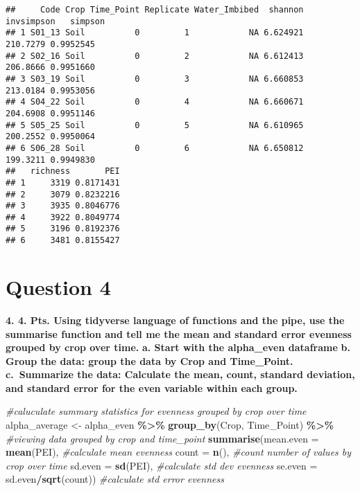 \documentclass[
]{article}
\newenvironment{Shaded}{\begin{snugshade}}{\end{snugshade}}
\newcommand{\AttributeTok}[1]{\textcolor[rgb]{0.13,0.29,0.53}{#1}}
\newcommand{\CommentTok}[1]{\textcolor[rgb]{0.56,0.35,0.01}{\textit{#1}}}
\newcommand{\FunctionTok}[1]{\textcolor[rgb]{0.13,0.29,0.53}{\textbf{#1}}}
\newcommand{\NormalTok}[1]{#1}
\newcommand{\OtherTok}[1]{\textcolor[rgb]{0.56,0.35,0.01}{#1}}
\newcommand{\SpecialCharTok}[1]{\textcolor[rgb]{0.81,0.36,0.00}{\textbf{#1}}}
\begin{document}
\begin{verbatim}
##     Code Crop Time_Point Replicate Water_Imbibed  shannon invsimpson   simpson
## 1 S01_13 Soil          0         1            NA 6.624921   210.7279 0.9952545
## 2 S02_16 Soil          0         2            NA 6.612413   206.8666 0.9951660
## 3 S03_19 Soil          0         3            NA 6.660853   213.0184 0.9953056
## 4 S04_22 Soil          0         4            NA 6.660671   204.6908 0.9951146
## 5 S05_25 Soil          0         5            NA 6.610965   200.2552 0.9950064
## 6 S06_28 Soil          0         6            NA 6.650812   199.3211 0.9949830
##   richness       PEI
## 1     3319 0.8171431
## 2     3079 0.8232216
## 3     3935 0.8046776
## 4     3922 0.8049774
## 5     3196 0.8192376
## 6     3481 0.8155427
\end{verbatim}

\section{Question 4}\label{question-4}

\textbf{4. 4. Pts. Using tidyverse language of functions and the pipe,
use the summarise function and tell me the mean and standard error
evenness grouped by crop over time.} \textbf{a. Start with the
alpha\_even dataframe} \textbf{b. Group the data: group the data by Crop
and Time\_Point.} \textbf{c.~Summarize the data: Calculate the mean,
count, standard deviation, and standard error for the even variable
within each group.}

\begin{Shaded}
\begin{Highlighting}[]
\CommentTok{\#caluculate summary statistics for evenness grouped by crop over time}
\NormalTok{alpha\_average }\OtherTok{\textless{}{-}}\NormalTok{  alpha\_even }\SpecialCharTok{\%\textgreater{}\%} 
  \FunctionTok{group\_by}\NormalTok{(Crop, Time\_Point) }\SpecialCharTok{\%\textgreater{}\%} \CommentTok{\#viewing data grouped by crop and time\_point}
  \FunctionTok{summarise}\NormalTok{(}\AttributeTok{mean.even =} \FunctionTok{mean}\NormalTok{(PEI), }\CommentTok{\#calculate mean evenness}
            \AttributeTok{count =} \FunctionTok{n}\NormalTok{(), }\CommentTok{\#count number of values by crop over time}
            \AttributeTok{sd.even =} \FunctionTok{sd}\NormalTok{(PEI), }\CommentTok{\#calculate std dev evenness}
            \AttributeTok{se.even =}\NormalTok{ sd.even}\SpecialCharTok{/}\FunctionTok{sqrt}\NormalTok{(count)) }\CommentTok{\#calculate std error evenness}
\end{Highlighting}
\end{Shaded}
\end{document}
